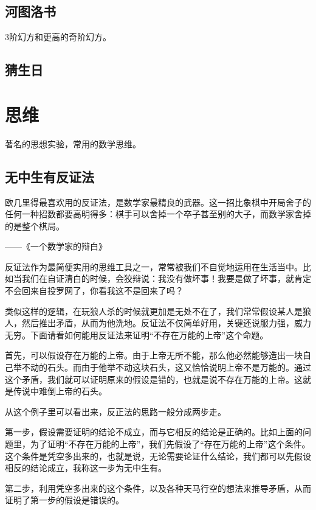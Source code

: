 \documentclass[export, 12pt, letterpaper]{ctexrep}
\newenvironment{shadedquotation}
 {\begin{shaded*}
  \quoting[leftmargin=5pt, rightmargin=5pt, vskip=0pt]
 }
 {\endquoting
 \end{shaded*}
}
\begin{document}
\section{河图洛书}
3阶幻方和更高的奇阶幻方。


\section{猜生日}




\chapter{思维}


著名的思想实验，常用的数学思维。

\section{无中生有反证法}
\begin{shadedquotation}
\noindent
欧几里得最喜欢用的反证法，是数学家最精良的武器。这一招比象棋中开局舍子的任何一种招数都要高明得多：棋手可以舍掉一个卒子甚至别的大子，而数学家舍掉的是整个棋局。
\noindent

\noindent
——《一个数学家的辩白》
\end{shadedquotation}


反证法作为最简便实用的思维工具之一，常常被我们不自觉地运用在生活当中。比如当我们在自证清白的时候，会狡辩说：我没有做坏事！我要是做了坏事，就肯定不会回来自投罗网了，你看我这不是回来了吗？

类似这样的逻辑，在玩狼人杀的时候就更加是无处不在了，我们常常假设某人是狼人，然后推出矛盾，从而为他洗地。反证法不仅简单好用，关键还说服力强，威力无穷。下面请看如何能用反证法来证明“不存在万能的上帝”这个命题。

首先，可以假设存在万能的上帝。由于上帝无所不能，那么他必然能够造出一块自己举不动的石头。而由于他举不动这块石头，这又恰恰说明上帝不是万能的。通过这个矛盾，我们就可以证明原来的假设是错的，也就是说不存在万能的上帝。这就是传说中难倒上帝的石头。

从这个例子里可以看出来，反正法的思路一般分成两步走。

第一步，假设需要证明的结论不成立，而与它相反的结论是正确的。比如上面的问题里，为了证明“不存在万能的上帝”，我们先假设了“存在万能的上帝”这个条件。这个条件是凭空多出来的，也就是说，无论需要论证什么结论，我们都可以先假设相反的结论成立，我称这一步为无中生有。

第二步，利用凭空多出来的这个条件，以及各种天马行空的想法来推导矛盾，从而证明了第一步的假设是错误的。
\end{document}
